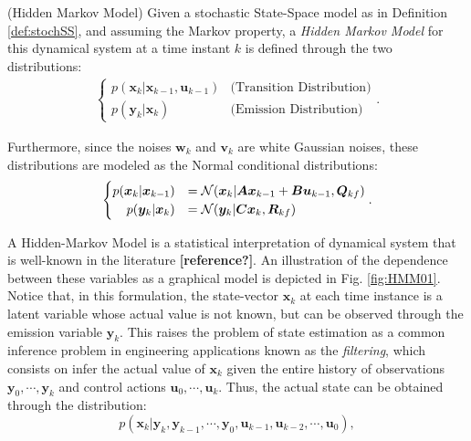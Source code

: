 \documentclass[a4paper,11pt]{book}
\numberwithin{figure}{chapter}
\numberwithin{equation}{chapter}
\numberwithin{table}{chapter}
\theoremstyle{definition}
\newtheorem{definition}{Definition}[chapter]
\newcounter{boxed-theorem}
\newcounter{boxed-definition}
\newenvironment{boxed-definition}[1]
{\begin{shaded} \begin{definition}{#1}}
{\end{definition} \end{shaded}}
\begin{document}
\begin{boxed-definition}{(Hidden Markov Model)} \label{def:HMM}
    Given a stochastic State-Space model as in Definition \ref{def:stochSS}, and assuming the Markov property, a \textit{Hidden Markov Model} for this dynamical system at a time instant $k$ is defined through the two distributions:
    \begin{align}
    \begin{cases}
        p(\bm{x}_{k} | \bm{x}_{k-1}, \bm{u}_{k-1}) & \text{(Transition Distribution)} \\
        p(\bm{y}_{k} | \bm{x}_{k}) & \text{(Emission Distribution)}
    \end{cases}
    .\end{align}
    
    Furthermore, since the noises $\bm{w}_k$ and $\bm{v}_k$ are white Gaussian noises, these distributions are modeled as the Normal conditional distributions:
    \begin{align}
    \begin{cases}
        p(\bm{x}_{k} | \bm{x}_{k-1}) &= \mathcal{N}(\bm{x}_k | \bm{A}\bm{x}_{k-1} + \bm{B}\bm{u}_{k-1}, \bm{Q}_{kf}) \\
        \hfill p(\bm{y}_{k} | \bm{x}_{k}) &= \mathcal{N}(\bm{y}_k | \bm{C}\bm{x}_{k}, \bm{R}_{kf})
    \end{cases}
    .\end{align}
\end{boxed-definition}

A Hidden-Markov Model is a statistical interpretation of dynamical system that is well-known in the literature \textbf{[reference?]}. An illustration of the dependence between these variables as a graphical model is depicted in Fig. \ref{fig:HMM01}. Notice that, in this formulation, the state-vector $\bm{x}_k$ at each time instance is a latent variable whose actual value is not known, but can be observed through the emission variable $\bm{y}_k$. This raises the problem of state estimation as a common inference problem in engineering applications known as the \textit{filtering}, which consists on infer the actual value of $\bm{x}_k$ given the entire history of observations $\bm{y}_0, \cdots, \bm{y}_k$ and control actions $\bm{u}_0, \cdots, \bm{u}_k$. Thus, the actual state can be obtained through the distribution:
\begin{equation}
    p(\bm{x}_k | \bm{y}_{k}, \bm{y}_{k-1}, \cdots, \bm{y}_0, \bm{u}_{k-1}, \bm{u}_{k-2}, \cdots, \bm{u}_0)
,\end{equation}
\end{document}
